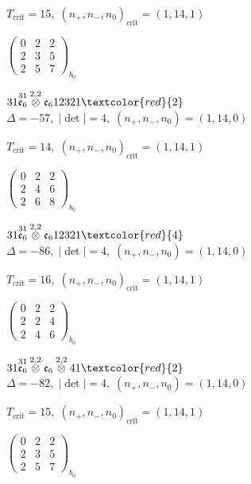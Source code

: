 \documentclass[10pt]{article}
\begin{document}
\hspace{1em}$T_{\text{crit}}=15,\; (n_+,n_-,n_0)_{\text{crit}}=(1,14,1)$

\hspace{2em}$\left(\begin{smallmatrix}0 & 2 & 2 \\ 2 & 3 & 5 \\ 2 & 5 & 7\end{smallmatrix}\right)_{\!b_0}$

\smallskip

$31\overset{31}{\mathfrak{e}_6}\overset{2,2}{\otimes}\mathfrak{e}_612321\textcolor{red}{2}$ \quad $\Delta=-57,\; |\det|=4,\; (n_+,n_-,n_0)=(1,14,0)$

\hspace{1em}$T_{\text{crit}}=14,\; (n_+,n_-,n_0)_{\text{crit}}=(1,14,1)$

\hspace{2em}$\left(\begin{smallmatrix}0 & 2 & 2 \\ 2 & 4 & 6 \\ 2 & 6 & 8\end{smallmatrix}\right)_{\!b_0}$

$31\overset{31}{\mathfrak{e}_6}\overset{2,2}{\otimes}\mathfrak{e}_612321\textcolor{red}{4}$ \quad $\Delta=-86,\; |\det|=4,\; (n_+,n_-,n_0)=(1,14,0)$

\hspace{1em}$T_{\text{crit}}=16,\; (n_+,n_-,n_0)_{\text{crit}}=(1,14,1)$

\hspace{2em}$\left(\begin{smallmatrix}0 & 2 & 2 \\ 2 & 2 & 4 \\ 2 & 4 & 6\end{smallmatrix}\right)_{\!b_0}$

\smallskip

$31\overset{31}{\mathfrak{e}_6}\overset{2,2}{\otimes}\mathfrak{e}_6\overset{2,2}{\otimes}41\textcolor{red}{2}$ \quad $\Delta=-82,\; |\det|=4,\; (n_+,n_-,n_0)=(1,14,0)$

\hspace{1em}$T_{\text{crit}}=15,\; (n_+,n_-,n_0)_{\text{crit}}=(1,14,1)$

\hspace{2em}$\left(\begin{smallmatrix}0 & 2 & 2 \\ 2 & 3 & 5 \\ 2 & 5 & 7\end{smallmatrix}\right)_{\!b_0}$
\end{document}
